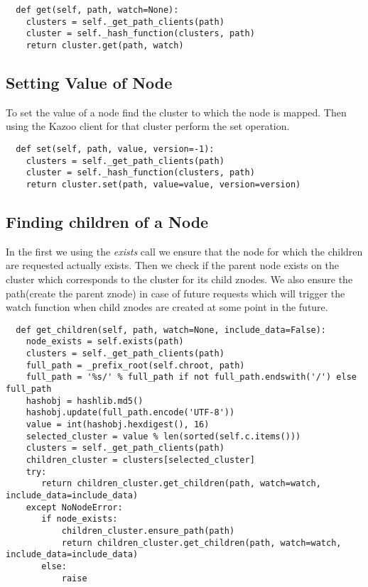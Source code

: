 \begin{lstlisting}
  def get(self, path, watch=None):
    clusters = self._get_path_clients(path)
    cluster = self._hash_function(clusters, path)
    return cluster.get(path, watch)
\end{lstlisting}


\subsection{Setting Value of Node}
To set the value of a node find the cluster to which the node is mapped. Then using the Kazoo client for that cluster perform the set operation. 

\begin{lstlisting}
  def set(self, path, value, version=-1):
    clusters = self._get_path_clients(path)
    cluster = self._hash_function(clusters, path)
    return cluster.set(path, value=value, version=version)
\end{lstlisting}

\subsection{Finding children of a Node}
In the first we using the \textit{exists} call we ensure that the node for which the children are requested actually exists. Then we check if the parent node exists on the cluster which corresponds to the cluster for its child znodes. We also ensure the path(create the parent znode) in case of future requests which will trigger the watch function when child znodes are created at some point in the future.

\begin{lstlisting}
  def get_children(self, path, watch=None, include_data=False):
    node_exists = self.exists(path)
    clusters = self._get_path_clients(path)
    full_path = _prefix_root(self.chroot, path)
    full_path = '%s/' % full_path if not full_path.endswith('/') else full_path
    hashobj = hashlib.md5()
    hashobj.update(full_path.encode('UTF-8'))
    value = int(hashobj.hexdigest(), 16)
    selected_cluster = value % len(sorted(self.c.items()))
    clusters = self._get_path_clients(path)
    children_cluster = clusters[selected_cluster]
    try:
       return children_cluster.get_children(path, watch=watch, include_data=include_data)
    except NoNodeError:
       if node_exists:
           children_cluster.ensure_path(path)
           return children_cluster.get_children(path, watch=watch, include_data=include_data)
       else:
           raise
\end{lstlisting}

